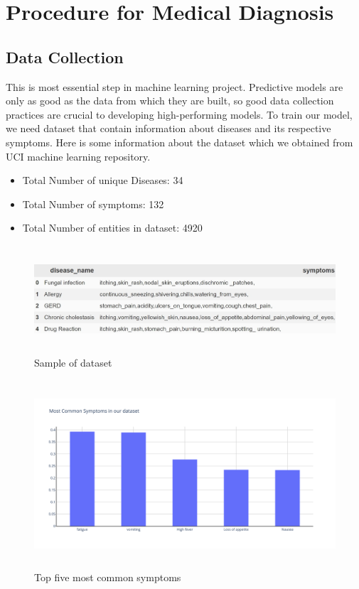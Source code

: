\section{Procedure for Medical Diagnosis}
\subsection{Data Collection}
This is most essential step in machine learning project. Predictive models are only as good as the data from which they are built, so good data collection practices are crucial to developing high-performing models. To train our model, we need dataset that contain information about diseases and its respective symptoms.\newline
Here is some information about the dataset which we obtained from UCI machine learning repository.
\begin{itemize}
    \item Total Number of unique Diseases: 34
    \item Total Number of symptoms: 132
    \item Total Number of entities in dataset: 4920
     
\end{itemize}

\begin{figure}[h]
\includegraphics[width=160mm,height=40mm]{dataset_summary/diseaseAndSymptoms.jpg}
 \caption{Sample of dataset}
\end{figure}

\begin{figure}[H]
 \includegraphics[width=150mm,height=70mm]{dataset_summary/top5Disease.jpg}
 \caption{Top five most common symptoms}
\end{figure}

